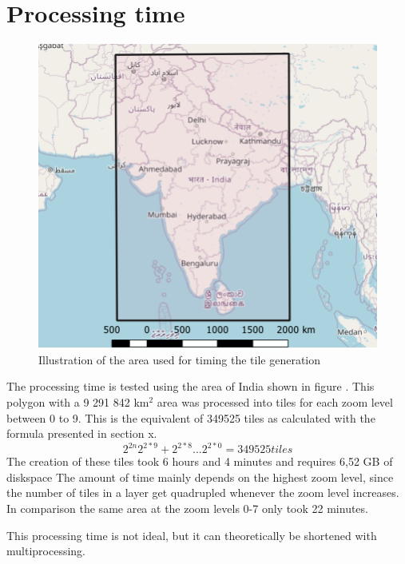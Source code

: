 \section{Processing time}\label{TilesTime}

\begin{figure} [H]
	\centering
	\includegraphics[width=.8\textwidth]{Pictures/ProcessingTime}
	\caption{Illustration of the area used for timing the tile generation}
	\label{ProcessingTime}
\end{figure}

The processing time is tested using the area of India shown in figure \citep{ProcessingTime}. This polygon with a 9 291 842 km$^2$ area was processed into tiles for each zoom level between 0 to 9. This is the equivalent of 349525 tiles as calculated with the formula presented in section x. 
\begin{equation}
2^{2n}
2^{2*9}+2^{2*8} .. . 2^{2*0} = 349525 tiles
\end{equation}
The creation of these tiles took 6 hours and 4 minutes and requires 6,52 GB of diskspace The amount of time mainly depends on the highest zoom level, since the number of tiles in a layer get quadrupled whenever the zoom level increases. In comparison the same area at the zoom levels 0-7 only took 22 minutes.

This processing time is not ideal, but it can theoretically be shortened with multiprocessing.
